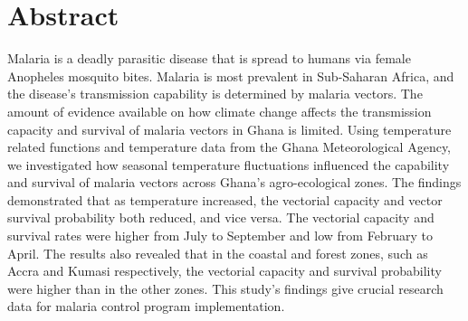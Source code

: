 \label{abstract}


\chapter*{Abstract}

Malaria is a deadly parasitic disease that is spread to humans via female Anopheles mosquito bites. Malaria is most prevalent in Sub-Saharan Africa, and the disease's transmission capability is determined by malaria vectors. The amount of evidence available on how climate change affects the transmission capacity and survival of malaria vectors in Ghana is limited. Using temperature related functions and temperature data from the Ghana Meteorological Agency, we investigated how seasonal temperature fluctuations influenced the capability and survival of malaria vectors across Ghana's agro-ecological zones. The findings demonstrated that as temperature increased, the vectorial capacity and vector survival probability both reduced, and vice versa. The vectorial capacity and survival rates were higher from July to September and low from February to April. The results also revealed that in the coastal and forest zones, such as Accra and Kumasi respectively, the vectorial capacity and survival probability were higher than in the other zones. 
This study's findings give crucial research data for malaria control program implementation.
 
